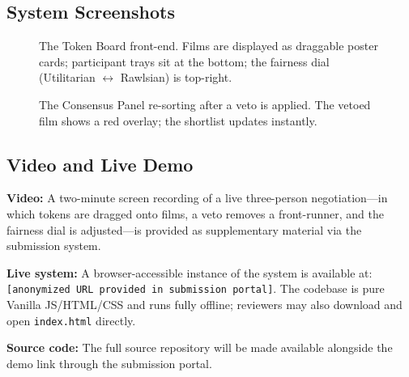 \documentclass[sigconf]{acmart}
\begin{document}
\subsection*{System Screenshots}

\begin{figure}[h]
\centering
{}
\caption{The Token Board front-end. Films are displayed as draggable poster cards; participant trays sit at the bottom; the fairness dial (Utilitarian $\leftrightarrow$ Rawlsian) is top-right.}
\label{fig:architecture}
\end{figure}

\begin{figure}[h]
\centering
{}
\caption{The Consensus Panel re-sorting after a veto is applied. The vetoed film shows a red overlay; the shortlist updates instantly.}
\label{fig:consensus}
\end{figure}

\subsection*{Video and Live Demo}

\noindent\textbf{Video:} A two-minute screen recording of a live three-person negotiation---in which tokens are dragged onto films, a veto removes a front-runner, and the fairness dial is adjusted---is provided as supplementary material via the submission system.

\vspace{0.5em}
\noindent\textbf{Live system:} A browser-accessible instance of the system is available at: \texttt{[anonymized URL provided in submission portal]}. The codebase is pure Vanilla JS/HTML/CSS and runs fully offline; reviewers may also download and open \texttt{index.html} directly.

\vspace{0.5em}
\noindent\textbf{Source code:} The full source repository will be made available alongside the demo link through the submission portal.
\end{document}
